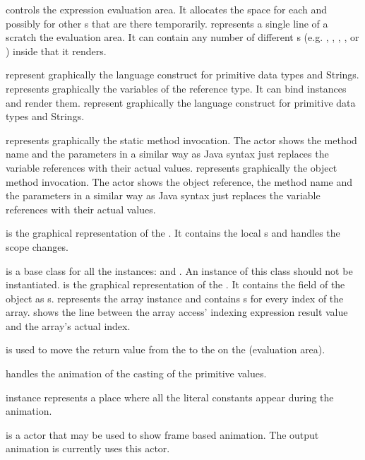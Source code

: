  controls the expression evaluation area. It allocates the space for each  and possibly for other s that are there temporarily.  represents a single line of a scratch the evaluation area. It can contain any number of different s (e.g. , , , ,  or ) inside that it renders.

 represent graphically the language construct  for primitive data types and Strings.  represents graphically the variables of the reference type. It can bind  instances and render them.  represent graphically the language construct  for primitive data types and Strings. 

 represents graphically the static method invocation. The actor shows the  method name and the parameters in a similar way as Java syntax just replaces the variable references with their actual values.  represents graphically the object method invocation. The actor shows the object reference, the method name and the parameters in a similar way as Java syntax just replaces the variable references with their actual values.

 is the graphical representation of the . It contains the local s and handles the scope changes.

 is a base class for all the instances:  and . An instance of this class should not be instantiated.  is the graphical representation of the . It contains the field of the object as s.  represents the array instance and contains s for every index of the array.  shows the line between the array access' indexing expression result value and the array's actual index. 

 is used to move the return value from the  to the  on the  (evaluation area).

 handles the animation of the casting of the primitive values.

 instance represents a place where all the literal constants appear during the animation.

 is a actor that may be used to show frame based animation. The output animation is currently uses this actor.

